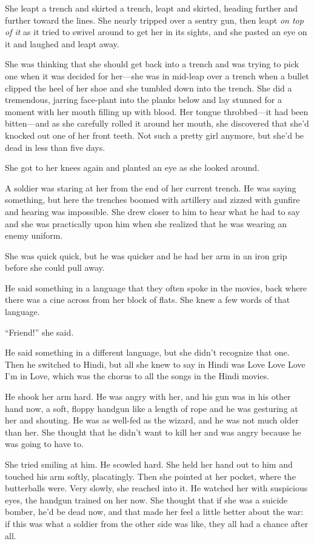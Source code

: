 She leapt a trench and skirted a trench, leapt and skirted, heading
further and further toward the lines. She nearly tripped over a
sentry gun, then leapt \emph{on top of it} as it tried to swivel
around to get her in its sights, and she pasted an eye on it and
laughed and leapt away.

She was thinking that she should get back into a trench and was
trying to pick one when it was decided for her—she was in mid-leap
over a trench when a bullet clipped the heel of her shoe and she
tumbled down into the trench. She did a tremendous, jarring
face-plant into the planks below and lay stunned for a moment with
her mouth filling up with blood. Her tongue throbbed—it had been
bitten—and as she carefully rolled it around her mouth, she
discovered that she’d knocked out one of her front teeth. Not such
a pretty girl anymore, but she’d be dead in less than five days.

She got to her knees again and planted an eye as she looked
around.

A soldier was staring at her from the end of her current trench. He
was saying something, but here the trenches boomed with artillery
and zizzed with gunfire and hearing was impossible. She drew closer
to him to hear what he had to say and she was practically upon him
when she realized that he was wearing an enemy uniform.

She was quick quick, but he was quicker and he had her arm in an
iron grip before she could pull away.

He said something in a language that they often spoke in the
movies, back where there was a cine across from her block of flats.
She knew a few words of that language.

“Friend!” she said.

He said something in a different language, but she didn’t recognize
that one. Then he switched to Hindi, but all she knew to say in
Hindi was Love Love Love I’m in Love, which was the chorus to all
the songs in the Hindi movies.

He shook her arm hard. He was angry with her, and his gun was in
his other hand now, a soft, floppy handgun like a length of rope
and he was gesturing at her and shouting. He was as well-fed as the
wizard, and he was not much older than her. She thought that he
didn’t want to kill her and was angry because he was going to have
to.

She tried smiling at him. He scowled hard. She held her hand out to
him and touched his arm softly, placatingly. Then she pointed at
her pocket, where the butterballs were. Very slowly, she reached
into it. He watched her with suspicious eyes, the handgun trained
on her now. She thought that if she was a suicide bomber, he’d be
dead now, and that made her feel a little better about the war: if
this was what a soldier from the other side was like, they all had
a chance after all.

